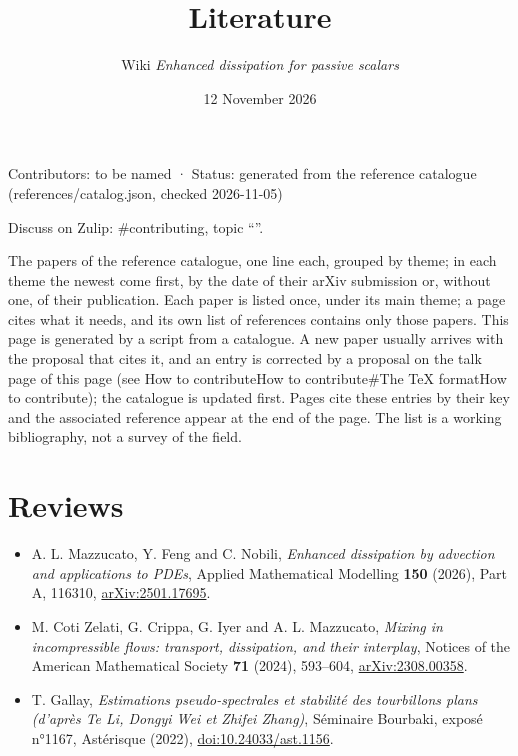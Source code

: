 \documentclass[11pt]{article}
\makeatletter
\theoremstyle{definition}
\theoremstyle{remark}
\newenvironment{note}[1][Note]{\begin{tcolorbox}[ed@note]\noindent{\itshape#1\@addpunct{.}}\enspace\ignorespaces}{\end{tcolorbox}}
\def\ed@title{}\let\ed@maketitle\maketitle\renewcommand{\maketitle}{\let\ed@title\@title\ed@maketitle}
\newcommand{\pagestatus}[1]{{\par\centering\small#1\par}}
\newcommand{\zulip}[2][]{{\par\centering\small Discuss on Zulip: \##2, topic
  ``\ifx\relax#1\relax\ed@title\else#1\fi''.\par}\medskip}
\newcommand{\wikilink}[2]{\ifx\relax#2\relax#1\else#2\fi}
\newcommand{\wikianchor}[1]{\phantomsection\label{#1}}
\makeatother
\begin{document}
\title{Literature}
\author{Wiki \emph{Enhanced dissipation for passive scalars}}
\date{12 November 2026}
\maketitle
\pagestatus{Contributors: to be named · Status: generated from the reference catalogue (references/catalog.json, checked 2026-11-05)}
\zulip{contributing}

The papers of the reference catalogue, one line each, grouped by theme; in each theme the newest come first, by the date of their arXiv submission or, without one, of their publication. Each paper is listed once, under its main theme; a page cites what it needs, and its own list of references contains only those papers. This page is generated by a script from a catalogue. A new paper usually arrives with the proposal that cites it, and an entry is corrected by a proposal on the talk page of this page (see \wikilink{How to contribute\#The TeX format}{How to contribute}); the catalogue is updated first. Pages cite these entries by their key and the associated reference appear at the end of the page. The list is a working bibliography, not a survey of the field.

\section{Reviews}
\begin{note}[Reviews (3)]
\begin{itemize}
  \item \wikianchor{MFN2026survey} A. L. Mazzucato, Y. Feng and C. Nobili, \emph{Enhanced dissipation by advection and applications to PDEs}, Applied Mathematical Modelling \textbf{150} (2026), Part A, 116310, \href{https://arxiv.org/abs/2501.17695}{arXiv:2501.17695}.
  \item \wikianchor{CZCIM2024} M. Coti Zelati, G. Crippa, G. Iyer and A. L. Mazzucato, \emph{Mixing in incompressible flows: transport, dissipation, and their interplay}, Notices of the American Mathematical Society \textbf{71} (2024), 593–604, \href{https://arxiv.org/abs/2308.00358}{arXiv:2308.00358}.
  \item \wikianchor{Gallay2022Bourbaki} T. Gallay, \emph{Estimations pseudo-spectrales et stabilité des tourbillons plans (d'après Te Li, Dongyi Wei et Zhifei Zhang)}, Séminaire Bourbaki, exposé n°1167, Astérisque (2022), \href{https://doi.org/10.24033/ast.1156}{doi:10.24033/ast.1156}.
\end{itemize}
\end{note}
\end{document}
